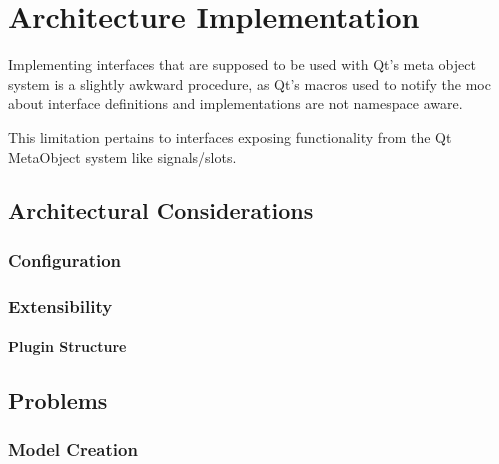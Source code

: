 \chapter{Architecture Implementation}

Implementing interfaces that are supposed to be used with Qt's meta object system is a slightly awkward procedure, as Qt's macros used to notify the moc about interface definitions and implementations are not namespace aware. 

This limitation pertains to interfaces exposing functionality from the Qt MetaObject system like signals/slots.

\section{Architectural Considerations}
\subsection{Configuration}



\subsection{Extensibility}
\subsubsection{Plugin Structure}

\section{Problems}
\subsection{Model Creation}
